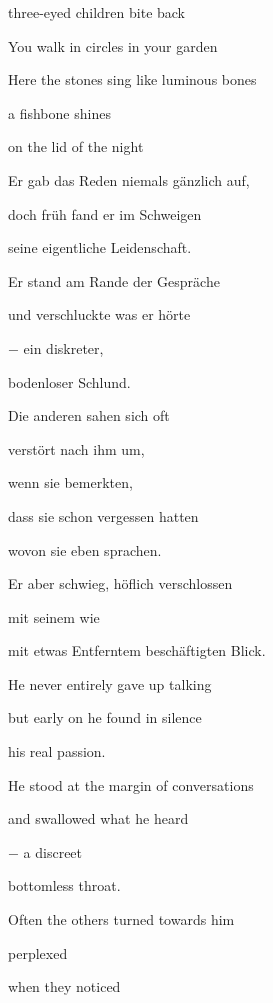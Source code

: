 \documentclass[a4paper]{article}
\begin{document}
three-eyed children bite back


\bigskip

You walk in circles in your garden

Here the stones sing like luminous bones

a fishbone shines

on the lid of the night


\bigskip



\bigskip

Er gab das Reden niemals gänzlich auf,

doch früh fand er im Schweigen

seine eigentliche Leidenschaft.

Er stand am Rande der Gespräche

und verschluckte was er hörte

$-$ ein diskreter,

bodenloser Schlund.


\bigskip

Die anderen sahen sich oft

verstört nach ihm um,

wenn sie bemerkten, 

dass sie schon vergessen hatten 

wovon sie eben sprachen.


\bigskip

Er aber schwieg, höflich verschlossen

mit seinem wie

mit etwas Entferntem beschäftigten Blick.


\bigskip



\bigskip

He never entirely gave up talking

but early on he found in silence

his real passion.

He stood at the margin of conversations

and swallowed what he heard

$-$ a discreet 

bottomless throat.


\bigskip

Often the others turned towards him 

perplexed

when they noticed
\end{document}
